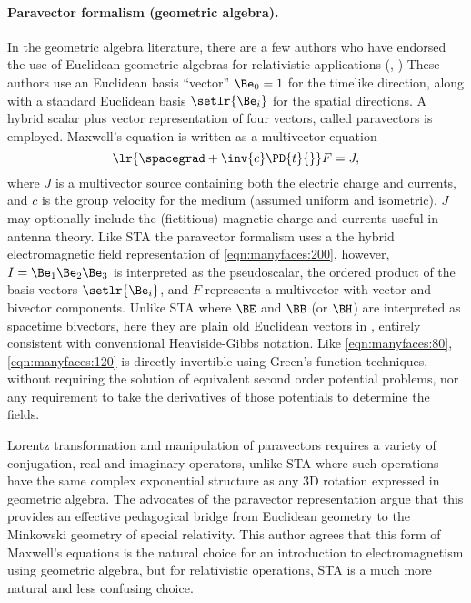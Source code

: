 \paragraph{Paravector formalism (geometric algebra).}
In the geometric algebra literature, there are a few authors who have endorsed the use of Euclidean geometric algebras for relativistic applications (\citep{baylis2004electrodynamics},
\citep{chappell2010simplified})
These authors use an Euclidean basis ``vector'' \( \Be_0 = 1 \) for the timelike direction, along with a standard Euclidean basis \( \setlr{ \Be_i } \) for the spatial directions.
A hybrid scalar plus vector representation of four vectors, called paravectors is employed.
Maxwell's equation is written as a multivector equation
\begin{dmath}\label{eqn:manyfaces:120}
\lr{ \spacegrad + \inv{c} \PD{t}{} } F = J,
\end{dmath}
where \( J \) is a multivector source containing both the electric charge and currents, and \( c \) is the group velocity for the medium (assumed uniform and isometric).
\( J \) may optionally include the (fictitious) magnetic charge and currents useful in antenna theory.
Like STA the paravector formalism uses a the hybrid electromagnetic field representation of \cref{eqn:manyfaces:200},
however,
\( I = \Be_1 \Be_2 \Be_3 \) is interpreted as the  pseudoscalar, the ordered product of the basis vectors \( \setlr{ \Be_i } \), and \( F \) represents a multivector with vector and bivector
components.
Unlike STA where \( \BE \) and \( \BB \) (or \( \BH \)) are interpreted as spacetime bivectors, here
they are plain old Euclidean vectors in , entirely consistent with conventional Heaviside-Gibbs notation.
Like \cref{eqn:manyfaces:80}, \cref{eqn:manyfaces:120} is directly invertible using Green's function techniques, without requiring the solution of equivalent second order potential problems, nor any requirement to take the derivatives of those potentials to determine the fields.

Lorentz transformation and manipulation of paravectors requires a
variety of conjugation, real and imaginary operators, unlike STA where such operations have the same complex exponential structure as any 3D rotation expressed in geometric algebra.
The advocates of the paravector representation argue that this provides an effective pedagogical bridge from Euclidean geometry to the Minkowski geometry of special relativity.
This author agrees that this form of Maxwell's equations is the natural choice for an introduction to electromagnetism using geometric algebra, but
for relativistic operations, STA is a much more natural and less confusing choice.

